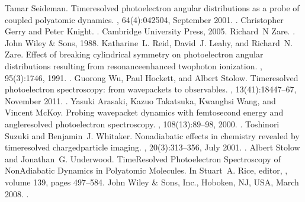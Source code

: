 \documentclass[letterpaper,table,10pt,english]{jupyterBook}
\begin{document}
\begin{sphinxthebibliography}{10}
\sphinxAtStartPar
Tamar Seideman. Time\sphinxhyphen{}resolved photoelectron angular distributions as a probe of coupled polyatomic dynamics. , 64(4):042504, September 2001. .
\sphinxAtStartPar
Christopher Gerry and Peter Knight. . Cambridge University Press, 2005.
\sphinxAtStartPar
Richard N Zare. . John Wiley \& Sons, 1988.
\sphinxAtStartPar
Katharine L. Reid, David J. Leahy, and Richard N. Zare. Effect of breaking cylindrical symmetry on photoelectron angular distributions resulting from resonance\sphinxhyphen{}enhanced two\sphinxhyphen{}photon ionization. , 95(3):1746, 1991. .
\sphinxAtStartPar
Guorong Wu, Paul Hockett, and Albert Stolow. Time\sphinxhyphen{}resolved photoelectron spectroscopy: from wavepackets to observables. , 13(41):18447–67, November 2011. .
\sphinxAtStartPar
Yasuki Arasaki, Kazuo Takatsuka, Kwanghsi Wang, and Vincent McKoy. Probing wavepacket dynamics with femtosecond energy\sphinxhyphen{} and angle\sphinxhyphen{}resolved photoelectron spectroscopy. , 108(1\sphinxhyphen{}3):89–98, 2000. .
\sphinxAtStartPar
Toshinori Suzuki and Benjamin J. Whitaker. Non\sphinxhyphen{}adiabatic effects in chemistry revealed by time\sphinxhyphen{}resolved charged\sphinxhyphen{}particle imaging. , 20(3):313–356, July 2001. .
\sphinxAtStartPar
Albert Stolow and Jonathan G. Underwood. Time\sphinxhyphen{}Resolved Photoelectron Spectroscopy of Non\sphinxhyphen{}Adiabatic Dynamics in Polyatomic Molecules. In Stuart A. Rice, editor, , volume 139, pages 497–584. John Wiley \& Sons, Inc., Hoboken, NJ, USA, March 2008. .

\end{sphinxthebibliography}
\end{document}
